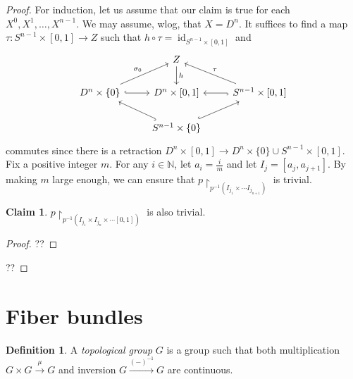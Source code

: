 \documentclass[10pt,letterpaper,cm]{nupset}
\theoremstyle{definition}
\newtheorem{defn}{Definition}[subsection]
\theoremstyle{theorem}
\newtheorem*{claim}{Claim}
\theoremstyle{remark}
\newcommand{\N}{\mathbb N}
\newcommand{\1}{\mathbb{1}}
\newcommand{\0}{\vec 0}
\DeclareMathOperator{\id}{id}
\begin{document}
\begin{proof}
For induction, let us assume that our claim is true for each $X^0, X^1, \ldots, X^{n-1}$. We may assume, wlog, that $X = D^n$. It suffices to find a map $\tau : S^{n-1} \times [0,1] \to Z$ such that $h \circ \tau = \id_{S^{n-1}\times [0,1]}$ and
\[
\begin{tikzcd}
                                                        & Z \arrow[d, "h"]                                       &                                                           \\
D^n \times \{0\} \arrow[r, hook] \arrow[ru, "\sigma_0"] & {D^n \times [0,1]}                                     & {S^{n-1}\times [0,1]} \arrow[l, hook] \arrow[lu, "\tau"'] \\
                                                        & S^{n-1} \times \{0\} \arrow[lu, hook] \arrow[ru, hook] &                                                          
\end{tikzcd}
\] commutes since there is a retraction $D^n \times [0,1] \to D^{n} \times \{0\} \cup S^{n-1}\times [0,1]$. Fix a positive integer $m$. For any $i\in \N$, let $a_i = \frac{i}{m}$ and let $I_j = [a_j, a_{j+1}]$. By making $m$ large enough, we can ensure that $p\restriction_{p^{-1}(I_{j_1} \times \cdots I_{j_{n+1}})}$ is trivial. 
\begin{claim}
$p\restriction_{p^{-1}(I_{j_1} \times I_{j_n} \times \cdots [0,1])}$ is also trivial. 
\end{claim}
\begin{proof}
??
\end{proof}
?? 
\end{proof}


\section{Fiber bundles}

\begin{defn}
A \textit{topological group} $G$ is a group such that both multiplication $G \times G \overset{\mu}{\longrightarrow} G$ and inversion $G \overset{({-})^{-1}}{\longrightarrow} G$ are continuous.
\end{defn}
\end{document}
